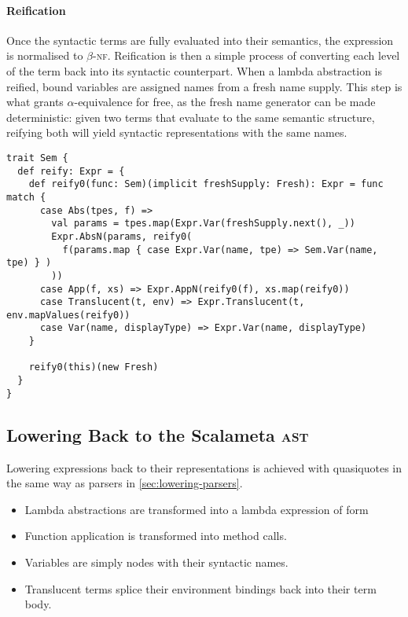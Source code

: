 \documentclass[../../../main.tex]{subfiles}
\begin{document}
\paragraph{Reification}
Once the syntactic terms are fully evaluated into their semantics, the expression is normalised to $\beta$-\textsc{nf}.
Reification is then a simple process of converting each level of the term back into its syntactic counterpart.
When a lambda abstraction is reified, bound variables are assigned names from a fresh name supply.
This step is what grants $\alpha$-equivalence for free, as the fresh name generator can be made deterministic: given two terms that evaluate to the same semantic structure, reifying both will yield syntactic representations with the same names.
%
\begin{verbatim}
trait Sem {
  def reify: Expr = {
    def reify0(func: Sem)(implicit freshSupply: Fresh): Expr = func match {
      case Abs(tpes, f) =>
        val params = tpes.map(Expr.Var(freshSupply.next(), _))
        Expr.AbsN(params, reify0(
          f(params.map { case Expr.Var(name, tpe) => Sem.Var(name, tpe) } )
        ))
      case App(f, xs) => Expr.AppN(reify0(f), xs.map(reify0))
      case Translucent(t, env) => Expr.Translucent(t, env.mapValues(reify0))
      case Var(name, displayType) => Expr.Var(name, displayType)
    }

    reify0(this)(new Fresh)
  }
}
\end{verbatim}

\subsection{Lowering Back to the Scalameta \textsc{ast}}
Lowering expressions back to their  representations is achieved with quasiquotes in the same way as parsers in \cref{sec:lowering-parsers}.
\begin{itemize}
  \item Lambda abstractions are transformed into a lambda expression of form 
  \item Function application is transformed into method calls.
  \item Variables are simply  nodes with their syntactic names.
  \item Translucent terms splice their environment bindings back into their term body.
\end{itemize}
\end{document}
